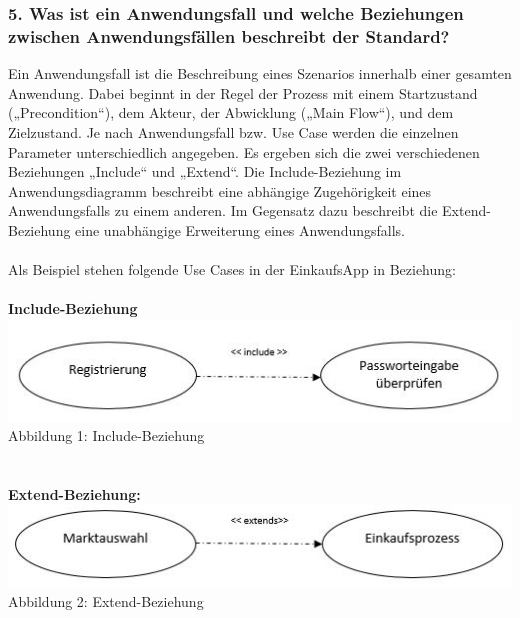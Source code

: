 \documentclass[12pt,a4paper]{article}
\begin{document}
\subsubsection*{5. Was ist ein Anwendungsfall und welche Beziehungen zwischen Anwendungsfällen beschreibt der Standard?}
Ein Anwendungsfall ist die Beschreibung eines Szenarios innerhalb einer gesamten Anwendung. 
Dabei beginnt in der Regel der Prozess mit einem Startzustand („Precondition“), dem Akteur, der Abwicklung („Main Flow“), und dem Zielzustand. 
Je nach Anwendungsfall bzw. Use Case werden die einzelnen Parameter unterschiedlich angegeben. Es ergeben sich die zwei verschiedenen Beziehungen „Include“ und „Extend“.
Die Include-Beziehung im Anwendungsdiagramm beschreibt eine abhängige Zugehörigkeit eines Anwendungsfalls zu einem anderen. Im Gegensatz dazu beschreibt die Extend-Beziehung eine unabhängige Erweiterung eines Anwendungsfalls.
\\
\\
Als Beispiel stehen folgende Use Cases in der EinkaufsApp in Beziehung:
\\
\\
\textbf{Include-Beziehung}
\\
\includegraphics[scale=1]{Include_Use-Case.JPG}
\\
\footnotesize Abbildung 1: Include-Beziehung
\normalsize
\\
\\
\\
\textbf{Extend-Beziehung:}
\\
\includegraphics[scale=1]{Extend_Use-Case.JPG}
\\
\footnotesize Abbildung 2: Extend-Beziehung
\normalsize
\\
\newpage
\end{document}

